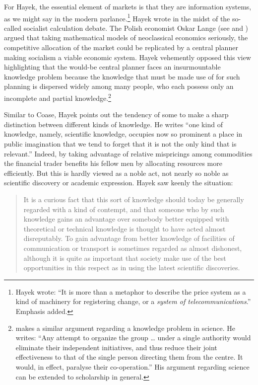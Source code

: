 \documentclass[11pt,]{article}
\begin{document}
For Hayek, the essential element of markets is that they are information
systems, as we might say in the modern parlance.\footnote{Hayek wrote:
  ``It is more than a metaphor to describe the price system as a kind of
  machinery for registering change, or a \emph{system of
  telecommunications}.'' Emphasis added.} Hayek wrote in the midst of
the so-called socialist calculation debate. The Polish economist Oskar
Lange (see \citet{Lange1936} and \citet{Lange1937}) argued that taking
mathematical models of neoclassical economics seriously, the competitive
allocation of the market could be replicated by a central planner making
socialism a viable economic system. Hayek vehemently opposed this view
highlighting that the would-be central planner faces an insurmountable
knowledge problem because the knowledge that must be made use of for
such planning is dispersed widely among many people, who each possess
only an incomplete and partial knowledge.\footnote{\citet{Polanyi2000}
  makes a similar argument regarding a knowledge problem in science. He
  writes: ``Any attempt to organize the group \ldots{} under a single
  authority would eliminate their independent initiatives, and thus
  reduce their joint effectiveness to that of the single person
  directing them from the centre. It would, in effect, paralyse their
  co-operation.'' His argument regarding science can be extended to
  scholarship in general.}

Similar to Coase, Hayek points out the tendency of some to make a sharp
distinction between different kinds of knowledge. He writes ``one kind
of knowledge, namely, scientific knowledge, occupies now so prominent a
place in public imagination that we tend to forget that it is not the
only kind that is relevant.'' Indeed, by taking advantage of relative
mispricings among commodities the financial trader benefits his fellow
men by allocating resources more efficiently. But this is hardly viewed
as a noble act, not nearly so noble as scientific discovery or academic
expression. Hayek saw keenly the situation:

\begin{quote}
It is a curious fact that this sort of knowledge should today be
generally regarded with a kind of contempt, and that someone who by such
knowledge gains an advantage over somebody better equipped with
theoretical or technical knowledge is thought to have acted almost
disreputably. To gain advantage from better knowledge of facilities of
communication or transport is sometimes regarded as almost dishonest,
although it is quite as important that society make use of the best
opportunities in this respect as in using the latest scientific
discoveries.
\end{quote}
\end{document}
